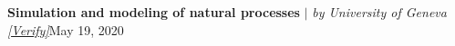 \resumeProjectHeading
    {\textbf{Simulation and modeling of natural processes} $|$ \emph{by University of Geneva \href{https://www.coursera.org/account/accomplishments/verify/P2DFKCEHK74V}{[\underline{Verify}]}}}{May 19, 2020}